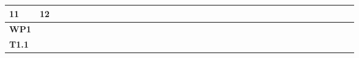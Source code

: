 \begin{table}[h]
{\begin{tabular}{|l|llllllllllll|llllllllllll|llllllllllll|}
  \multicolumn{1}{l|}{{\color[HTML]{FE0000} \textbf{11}}} &
  {\color[HTML]{FE0000} \textbf{12}} \\ 
\hline
\textbf{WP1} &
  \multicolumn{1}{l|}{\cellcolor[HTML]{DDD9C3}} &
  \multicolumn{1}{l|}{\cellcolor[HTML]{DDD9C3}} &
  \multicolumn{1}{l|}{\cellcolor[HTML]{DDD9C3}} &
  \multicolumn{1}{l|}{\cellcolor[HTML]{DDD9C3}} &
  \multicolumn{1}{l|}{\cellcolor[HTML]{DDD9C3}} &
  \multicolumn{1}{l|}{\cellcolor[HTML]{DDD9C3}} &
  \multicolumn{1}{l|}{\cellcolor[HTML]{DDD9C3}} &
  \multicolumn{1}{l|}{\cellcolor[HTML]{DDD9C3}} &
  \multicolumn{1}{l|}{\cellcolor[HTML]{DDD9C3}} &
  \multicolumn{1}{l|}{\cellcolor[HTML]{DDD9C3}} &
  \multicolumn{1}{l|}{\cellcolor[HTML]{DDD9C3}} &
  \multicolumn{1}{l|}{\cellcolor[HTML]{DDD9C3}} &
  \multicolumn{1}{l|}{\cellcolor[HTML]{DDD9C3}} &
  \multicolumn{1}{l|}{\cellcolor[HTML]{DDD9C3}} &
  \multicolumn{1}{l|}{\cellcolor[HTML]{DDD9C3}} &
  \multicolumn{1}{l|}{\cellcolor[HTML]{DDD9C3}} &
  \multicolumn{1}{l|}{\cellcolor[HTML]{DDD9C3}} &
  \multicolumn{1}{l|}{\cellcolor[HTML]{DDD9C3}} &
  \multicolumn{1}{l|}{\cellcolor[HTML]{DDD9C3}} &
  \multicolumn{1}{l|}{\cellcolor[HTML]{DDD9C3}} &
  \multicolumn{1}{l|}{\cellcolor[HTML]{DDD9C3}} &
  \multicolumn{1}{l|}{\cellcolor[HTML]{DDD9C3}} &
  \multicolumn{1}{l|}{\cellcolor[HTML]{DDD9C3}} &
  \multicolumn{1}{l|}{\cellcolor[HTML]{DDD9C3}} &
  \multicolumn{1}{l|}{} &
  \multicolumn{1}{l|}{} &
  \multicolumn{1}{l|}{} &
  \multicolumn{1}{l|}{} &
  \multicolumn{1}{l|}{} &
  \multicolumn{1}{l|}{} &
  \multicolumn{1}{l|}{} &
  \multicolumn{1}{l|}{} &
  \multicolumn{1}{l|}{} &
  \multicolumn{1}{l|}{} &
  \multicolumn{1}{l|}{} &
  \multicolumn{1}{l|}{} 
  \\ \hline
\textbf{T1.1} &
  \multicolumn{1}{l|}{\cellcolor[HTML]{FBD4B4}} &
  \multicolumn{1}{l|}{\cellcolor[HTML]{FBD4B4}} &
  \multicolumn{1}{l|}{\cellcolor[HTML]{FBD4B4}} &
  \multicolumn{1}{l|}{\cellcolor[HTML]{FBD4B4}} &
  \multicolumn{1}{l|}{\cellcolor[HTML]{FBD4B4}} &
  \multicolumn{1}{l|}{\cellcolor[HTML]{FBD4B4}} &
  \multicolumn{1}{l|}{\cellcolor[HTML]{FBD4B4}} &
  \multicolumn{1}{l|}{\cellcolor[HTML]{FBD4B4}} &
  \multicolumn{1}{l|}{\cellcolor[HTML]{FBD4B4}} &
  \multicolumn{1}{l|}{} &
  \multicolumn{1}{l|}{} &
  \multicolumn{1}{l|}{} &
  \multicolumn{1}{l|}{} &
  \multicolumn{1}{l|}{} &
  \multicolumn{1}{l|}{} &
  \multicolumn{1}{l|}{} &
  \multicolumn{1}{l|}{} &
  \multicolumn{1}{l|}{} &
  \multicolumn{1}{l|}{} &
  \multicolumn{1}{l|}{} &
  \multicolumn{1}{l|}{} &
  \multicolumn{1}{l|}{} &
  \multicolumn{1}{l|}{} &
  \multicolumn{1}{l|}{} &

\end{tabular}}
\end{table}
